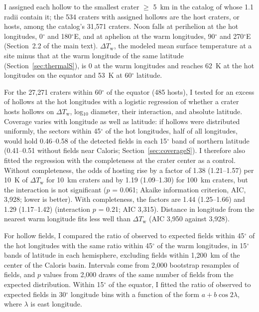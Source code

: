 \documentclass{planetary}
\begin{document}
I assigned each hollow to the smallest crater $\geq$ 5~km in the catalog of \textcite{herrick2018} whose 1.1 radii contain it; the 534 craters with assigned hollows are the host craters, or hosts, among the catalog's 31,571 craters. Noon falls at perihelion at the hot longitudes, 0$^\circ$ and 180$^\circ$E, and at aphelion at the warm longitudes, 90$^\circ$ and 270$^\circ$E (Section~2.2 of the main text). $\Delta T_\mathrm{w}$, the modeled mean surface temperature at a site minus that at the warm longitude of the same latitude (Section~\ref{sec:thermalS}), is 0 at the warm longitudes and reaches 62~K at the hot longitudes on the equator and 53~K at 60$^\circ$ latitude.

For the 27,271 craters within 60$^\circ$ of the equator (485 hosts), I tested for an excess of hollows at the hot longitudes with a logistic regression of whether a crater hosts hollows on $\Delta T_\mathrm{w}$, log$_{10}$ diameter, their interaction, and absolute latitude. Coverage varies with longitude as well as latitude: if hollows were distributed uniformly, the sectors within 45$^\circ$ of the hot longitudes, half of all longitudes, would hold 0.46--0.58 of the detected fields in each 15$^\circ$ band of northern latitude (0.41--0.51 without fields near Caloris; Section~\ref{sec:coverageS}). I therefore also fitted the regression with the completeness at the crater center as a control. Without completeness, the odds of hosting rise by a factor of 1.38 (1.21--1.57) per 10~K of $\Delta T_\mathrm{w}$ for 10~km craters and by 1.19 (1.09--1.30) for 100~km craters, but the interaction is not significant ($p$ = 0.061; Akaike information criterion, AIC, 3,928; lower is better). With completeness, the factors are 1.44 (1.25--1.66) and 1.29 (1.17--1.42) (interaction $p$ = 0.21; AIC 3,315). Distance in longitude from the nearest warm longitude fits less well than $\Delta T_\mathrm{w}$ (AIC 3,950 against 3,928).

For hollow fields, I compared the ratio of observed to expected fields within 45$^\circ$ of the hot longitudes with the same ratio within 45$^\circ$ of the warm longitudes, in 15$^\circ$ bands of latitude in each hemisphere, excluding fields within 1,200~km of the center of the Caloris basin. Intervals come from 2,000 bootstrap resamples of fields, and $p$ values from 2,000 draws of the same number of fields from the expected distribution. Within 15$^\circ$ of the equator, I fitted the ratio of observed to expected fields in 30$^\circ$ longitude bins with a function of the form $a + b \cos 2\lambda$, where $\lambda$ is east longitude.
\end{document}
